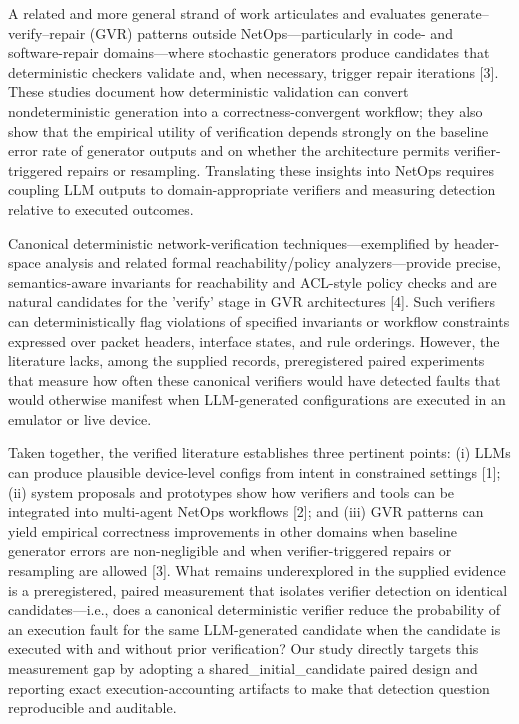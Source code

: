 \documentclass[conference]{IEEEtran}
\begin{document}
A related and more general strand of work articulates and evaluates generate--verify--repair (GVR) patterns outside NetOps---particularly in code- and software-repair domains---where stochastic generators produce candidates that deterministic checkers validate and, when necessary, trigger repair iterations [3]. These studies document how deterministic validation can convert nondeterministic generation into a correctness-convergent workflow; they also show that the empirical utility of verification depends strongly on the baseline error rate of generator outputs and on whether the architecture permits verifier-triggered repairs or resampling. Translating these insights into NetOps requires coupling LLM outputs to domain-appropriate verifiers and measuring detection relative to executed outcomes.

Canonical deterministic network-verification techniques---exemplified by header-space analysis and related formal reachability/policy analyzers---provide precise, semantics-aware invariants for reachability and ACL-style policy checks and are natural candidates for the 'verify' stage in GVR architectures [4]. Such verifiers can deterministically flag violations of specified invariants or workflow constraints expressed over packet headers, interface states, and rule orderings. However, the literature lacks, among the supplied records, preregistered paired experiments that measure how often these canonical verifiers would have detected faults that would otherwise manifest when LLM-generated configurations are executed in an emulator or live device.

Taken together, the verified literature establishes three pertinent points: (i) LLMs can produce plausible device-level configs from intent in constrained settings [1]; (ii) system proposals and prototypes show how verifiers and tools can be integrated into multi-agent NetOps workflows [2]; and (iii) GVR patterns can yield empirical correctness improvements in other domains when baseline generator errors are non-negligible and when verifier-triggered repairs or resampling are allowed [3]. What remains underexplored in the supplied evidence is a preregistered, paired measurement that isolates verifier detection on identical candidates---i.e., does a canonical deterministic verifier reduce the probability of an execution fault for the same LLM-generated candidate when the candidate is executed with and without prior verification? Our study directly targets this measurement gap by adopting a shared\_initial\_candidate paired design and reporting exact execution-accounting artifacts to make that detection question reproducible and auditable.
\end{document}
